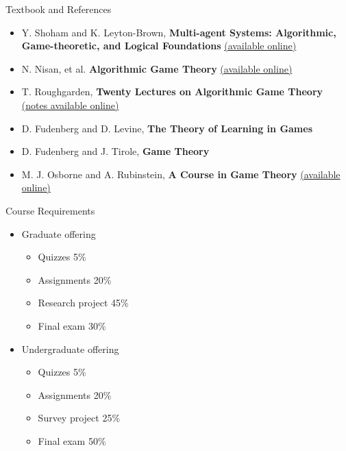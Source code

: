 \documentclass[11pt,aspectratio=169,handout]{beamer}
\begin{document}
  \begin{frame}{Textbook and References}
   \footnotesize
   \begin{itemize}
    \setlength{\itemsep}{1em}
    \item Y. Shoham and K. Leyton-Brown, \textbf{Multi-agent Systems: Algorithmic, Game-theoretic, and Logical Foundations} \href{http://www.masfoundations.org/mas.pdf}{(available online)}
    \item	N. Nisan, et al. \textbf{Algorithmic Game Theory} \href{https://www.cs.cmu.edu/~sandholm/cs15-892F13/algorithmic-game-theory.pdf}{(available online)}
    \item T. Roughgarden, \textbf{Twenty Lectures on Algorithmic Game Theory} \href{https://timroughgarden.org/notes.html}{(notes available online)}
    \item D. Fudenberg and D. Levine, \textbf{The Theory of Learning in Games}
    \item D. Fudenberg and J. Tirole, \textbf{Game Theory}
    \item M. J. Osborne and A. Rubinstein, \textbf{A Course in Game Theory} \href{https://books.osborne.economics.utoronto.ca/}{(available online)}
   \end{itemize}
  \end{frame}
 
  \begin{frame}{Course Requirements}
   \begin{itemize}
    \item<+-> Graduate offering
    \begin{itemize}[<+-| alert@+>]
     \item Quizzes 5\%
     \item Assignments 20\%
     \item Research project 45\%
     \item Final exam 30\%
    \end{itemize}
    \vspace{1.4em}
    \item<+-> Undergraduate offering
    \begin{itemize}[<+-| alert@+>]
     \item Quizzes 5\%
     \item Assignments 20\%
     \item Survey project 25\%
     \item Final exam 50\%
    \end{itemize}
   \end{itemize}
  \end{frame}
 
\end{document}
